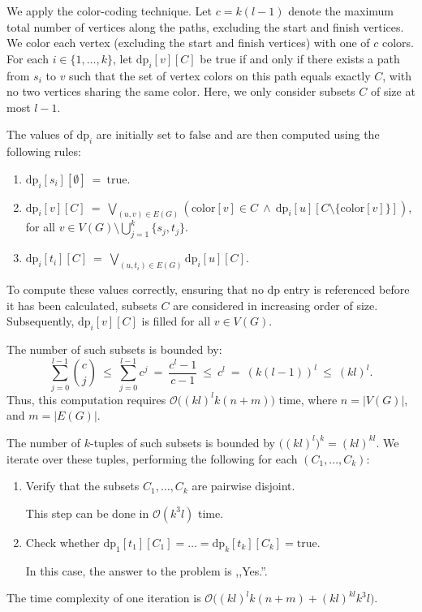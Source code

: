 \documentclass[12pt]{article}
\begin{document}
	\medskip
	
	We apply the color-coding technique. Let \(c = k(l - 1)\) denote the
	maximum total number of vertices along the paths, excluding the start and
	finish vertices. We color each vertex (excluding the start and finish
	vertices) with one of \(c\) colors. For each \(i \in \{1, \ldots, k\}\), let
	\(\text{dp}_{i}[v][C]\) be true if and only if there exists a path from
	\(s_{i}\) to \(v\) such that the set of vertex colors on this path equals
	exactly \(C\), with no two vertices sharing the same color. Here, we only
	consider subsets \(C\) of size at most \(l - 1\).
	
	\medskip
	
	The values of \(\text{dp}_{i}\) are initially set to \(\text{false}\) and
	are then computed using the following rules:
	\begin{enumerate}
		\item \(\text{dp}_{i}[s_{i}][\emptyset] \ = \ \text{true}\).
		\item \(\text{dp}_{i}[v][C] \ = \ \bigvee\limits_{(u, v) \in E(G)}
		      (\text{color}[v] \in C \ \wedge \
		      \text{dp}_{i}[u][C \setminus \{\text{color}[v]\}])\), for all
		      \(v \in V(G) \setminus \bigcup\limits_{j = 1}^{k} \{s_{j}, t_{j}\}\).
		\item \(\text{dp}_{i}[t_{i}][C] \ = \ \bigvee\limits_{(u, t_{i}) \in
		      E(G)} \text{dp}_{i}[u][C]\).
	\end{enumerate}
	To compute these values correctly, ensuring that no \(\text{dp}\) entry is
	referenced before it has been calculated, subsets \(C\) are considered in
	increasing order of size. Subsequently, \(\text{dp}_{i}[v][C]\) is filled
	for all \(v \in V(G)\).
	
	\medskip
	
	The number of such subsets is bounded by:
	\[ \sum\limits_{j = 0}^{l - 1} \binom{c}{j} \ \leqslant \
	\sum\limits_{j = 0}^{l - 1} c^{j} \ = \ \frac{c^{l} - 1}{c - 1} \ \leqslant
	\ c^{l} \ = \ (k (l - 1))^{l} \ \leqslant \ (kl)^{l} \text{.} \]
	Thus, this computation requires \(\mathcal{O} \big( (kl)^{l} k (n + m)
	\big)\) time, where \(n = |V(G)|\), and \(m = |E(G)|\).
	
	\medskip
	
	The number of \(k\)-tuples of such subsets is bounded by \(\big( (kl)^l
	\big)^{k} = (kl)^{kl}\). We iterate over these tuples, performing the
	following for each \((C_{1}, \ldots, C_{k})\):
	\begin{enumerate}
		\item Verify that the subsets \(C_{1}, \ldots, C_{k}\) are pairwise
		      disjoint.
		      
		      This step can be done in \(\mathcal{O}(k^{3} l)\) time.
		
		\item Check whether \(\text{dp}_{1}[t_{1}][C_{1}] = \ldots =
		      \text{dp}_{k}[t_{k}][C_{k}] = \text{true}\).
		      
		      In this case, the answer to the problem is ,,Yes.''.
	\end{enumerate}
	The time complexity of one iteration is \(\mathcal{O} \big( (kl)^l k (n + m)
	+ (kl)^{kl} k^{3} l \big)\).
	
\end{document}
